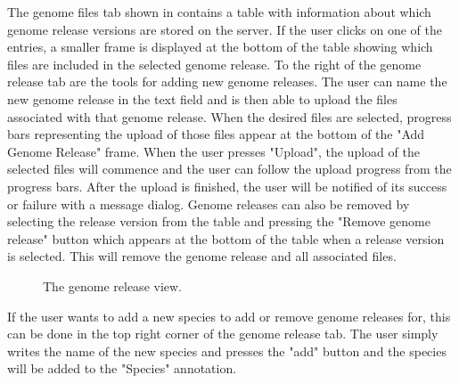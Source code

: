 The genome files tab shown in  contains a table with information about which genome release versions are stored on the server. If the user clicks on one of the entries, a smaller frame is displayed at the bottom of the table showing which files are included in the selected genome release. To the right of the genome release tab are the tools for adding new genome releases. The user can name the new genome release in the text field and is then able to upload the files associated with that genome release. When the desired files are selected, progress bars representing the upload of those files appear at the bottom of the "Add Genome Release" frame. When the user presses "Upload", the upload of the selected files will commence and the user can follow the upload progress from the progress bars. After the upload is finished, the user will be notified of its success or failure with a message dialog.
Genome releases can also be removed by selecting the release version from the table and pressing the "Remove genome release" button which appears at the bottom of the table when a release version is selected. This will remove the genome release and all associated files.

\begin{figure}[h!]
\caption{The genome release view.}
\label{fig:adm_desktopGenomeTab}
\end{figure}

If the user wants to add a new species to add or remove genome releases for, this can be done in the top right corner of the genome release tab. The user simply writes the name of the new species and presses the "add" button and the species will be added to the "Species" annotation.
